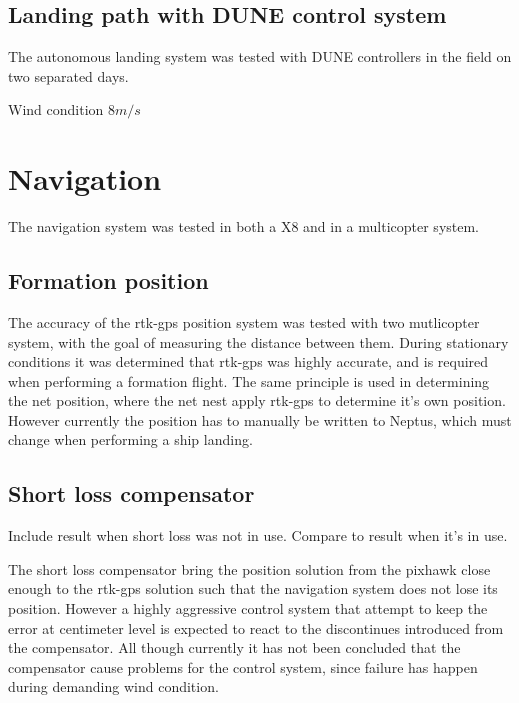 \subsection*{Landing path with DUNE control system}
The autonomous landing system was tested with DUNE controllers in the field on two separated days.

Wind condition $8 m/s$
\section{Navigation}
The navigation system was tested in both a X8 and in a multicopter system.

\subsection{Formation position}
The accuracy of the \gls{rtk-gps} position system was tested with two mutlicopter system, with the goal of measuring the distance between them. During stationary conditions it was determined that \gls{rtk-gps} was highly accurate, and is required when performing a formation flight. The same principle is used in determining the net position, where the net nest apply \gls{rtk-gps} to determine it's own position. However currently the position has to manually be written to Neptus, which must change when performing a ship landing.
\subsection{Short loss compensator}
Include result when short loss was not in use. Compare to result when it's in use.

The short loss compensator bring the position solution from the pixhawk close enough to the \gls{rtk-gps} solution such that the navigation system does not lose its position. However a highly aggressive control system that attempt to keep the error at centimeter level is expected to react to the discontinues introduced from the compensator. All though currently it has not been concluded that the compensator cause problems for the control system, since failure has happen during demanding wind condition. 